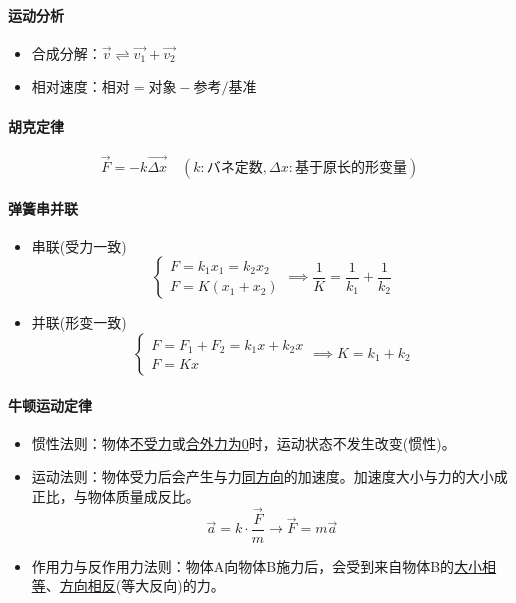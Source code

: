 \paragraph{运动分析}
\begin{itemize}
    \item 合成分解：$\vec{v}\rightleftharpoons\vec{v_1}+\vec{v_2}$
    \item 相对速度：$\textrm{相对}=\textrm{对象}-\textrm{参考/基准}$
\end{itemize}

\paragraph{胡克定律}
\begin{equation*}
    \vec{F}=-k\vec{\Delta x}\quad(k:\textrm{バネ定数},\Delta x:\textrm{基于原长的形变量})
\end{equation*}

\paragraph{弹簧串并联}
\begin{itemize}
    \item 串联(受力一致)
    \begin{equation*}
        \begin{cases}
            F=k_1x_1=k_2x_2\\
            F=K(x_1+x_2)
        \end{cases}\implies\frac1K=\frac1{k_1}+\frac1{k_2}
    \end{equation*}
    \item 并联(形变一致)
    \begin{equation*}
        \begin{cases}
            F=F_1+F_2=k_1x+k_2x\\F=Kx
        \end{cases}\implies K=k_1+k_2
    \end{equation*}
\end{itemize}

\paragraph{牛顿运动定律}
\begin{itemize}
    \item 惯性法则：物体\underline{不受力}或\underline{合外力为0}时，运动状态不发生改变(惯性)。
    \item 运动法则：物体受力后会产生与力\underline{同方向}的加速度。加速度大小与力的大小成正比，与物体质量成反比。
    \begin{equation*}
        \vec{a}=k\cdot\frac{\vec{F}}{m}\to
        \vec{F}=m\vec{a}
    \end{equation*}
    \item 作用力与反作用力法则：物体A向物体B施力后，会受到来自物体B的\underline{大小相等}、\underline{方向相反}(等大反向)的力。
\end{itemize}

